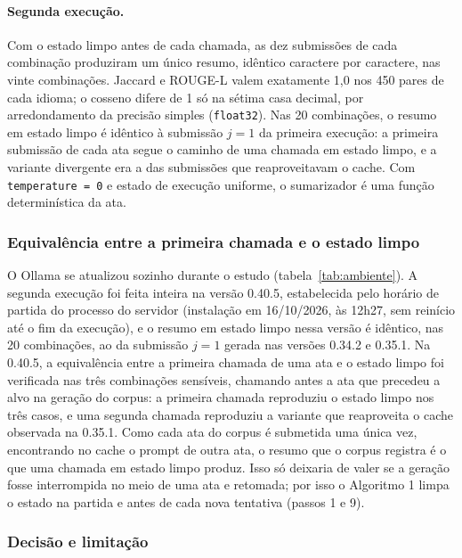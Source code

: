 \documentclass[12pt]{article}
\begin{document}
\paragraph{Segunda execução.} Com o estado limpo antes de cada chamada, as dez
submissões de cada combinação produziram um único resumo, idêntico caractere
por caractere, nas vinte combinações. Jaccard e ROUGE-L valem exatamente 1,0
nos 450 pares de cada idioma; o cosseno difere de 1 só na sétima casa decimal,
por arredondamento da precisão simples (\texttt{float32}). Nas 20 combinações, o
resumo em estado limpo é idêntico à submissão $j = 1$ da primeira execução: a
primeira submissão de cada ata segue o caminho de uma chamada em estado limpo,
e a variante divergente era a das submissões que reaproveitavam o cache. Com
\texttt{temperature = 0} e estado de execução uniforme, o sumarizador é uma
função determinística da ata.

\subsubsection{Equivalência entre a primeira chamada e o estado
limpo}\label{sec:equivalencia}

O Ollama se atualizou sozinho durante o estudo (tabela~\ref{tab:ambiente}). A
segunda execução foi feita inteira na versão 0.40.5, estabelecida pelo horário
de partida do processo do servidor (instalação em 16/10/2026, às 12h27, sem
reinício até o fim da execução), e o resumo em estado limpo nessa versão é
idêntico, nas 20 combinações, ao da submissão $j = 1$ gerada nas versões 0.34.2
e 0.35.1. Na 0.40.5, a equivalência entre a primeira chamada de uma ata e o
estado limpo foi verificada nas três combinações sensíveis, chamando antes a ata
que precedeu a alvo na geração do corpus: a primeira chamada reproduziu o estado
limpo nos três casos, e uma segunda chamada reproduziu a variante que
reaproveita o cache observada na 0.35.1. Como cada ata do corpus é submetida
uma única vez, encontrando no cache o prompt de outra ata, o resumo que o corpus
registra é o que uma chamada em estado limpo produz. Isso só deixaria de valer
se a geração fosse interrompida no meio de uma ata e retomada; por isso o
Algoritmo 1 limpa o estado na partida e antes de cada nova tentativa (passos 1
e 9).

\subsubsection{Decisão e limitação}\label{sec:det-decisao}
\end{document}
